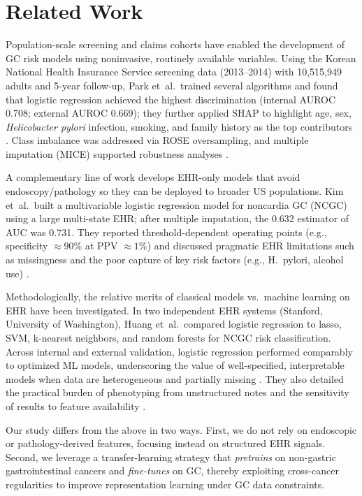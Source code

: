 \documentclass[journal,article,submit,pdftex,moreauthors]{Definitions/mdpi}
\begin{document}
\section{Related Work}
{
\color{red}
Population-scale screening and claims cohorts have enabled the development of GC risk models using noninvasive, routinely available variables. Using the Korean National Health Insurance Service screening data (2013--2014) with 10{,}515{,}949 adults and 5-year follow-up, Park et~al.\ trained several algorithms and found that logistic regression achieved the highest discrimination (internal AUROC 0.708; external AUROC 0.669); they further applied SHAP to highlight age, sex, \textit{Helicobacter pylori} infection, smoking, and family history as the top contributors \citep{park2024crt}. Class imbalance was addressed via ROSE oversampling, and multiple imputation (MICE) supported robustness analyses \citep{park2024crt}.

A complementary line of work develops EHR-only models that avoid endoscopy/pathology so they can be deployed to broader US populations. Kim et~al.\ built a multivariable logistic regression model for noncardia GC (NCGC) using a large multi-state EHR; after multiple imputation, the 0.632 estimator of AUC was 0.731. They reported threshold-dependent operating points (e.g., specificity $\approx90\%$ at PPV $\approx1\%$) and discussed pragmatic EHR limitations such as missingness and the poor capture of key risk factors (e.g., H.\ pylori, alcohol use) \citep{kim2024gastha}.

Methodologically, the relative merits of classical models vs.\ machine learning on EHR have been investigated. In two independent EHR systems (Stanford, University of Washington), Huang et~al.\ compared logistic regression to lasso, SVM, k-nearest neighbors, and random forests for NCGC risk classification. Across internal and external validation, logistic regression performed comparably to optimized ML models, underscoring the value of well-specified, interpretable models when data are heterogeneous and partially missing \citep{huang2022jco}. They also detailed the practical burden of phenotyping from unstructured notes and the sensitivity of results to feature availability \citep{huang2022jco}.

Our study differs from the above in two ways. First, we do not rely on endoscopic or pathology-derived features, focusing instead on structured EHR signals. Second, we leverage a transfer-learning strategy that \emph{pretrains} on non-gastric gastrointestinal cancers and \emph{fine-tunes} on GC, thereby exploiting cross-cancer regularities to improve representation learning under GC data constraints.
}
\end{document}
